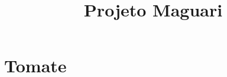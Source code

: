 \documentclass[a4paper,12pt]{article}
\title{Projeto Maguari}
\begin{document}
\maketitle


\section{Tomate}



\end{document}
